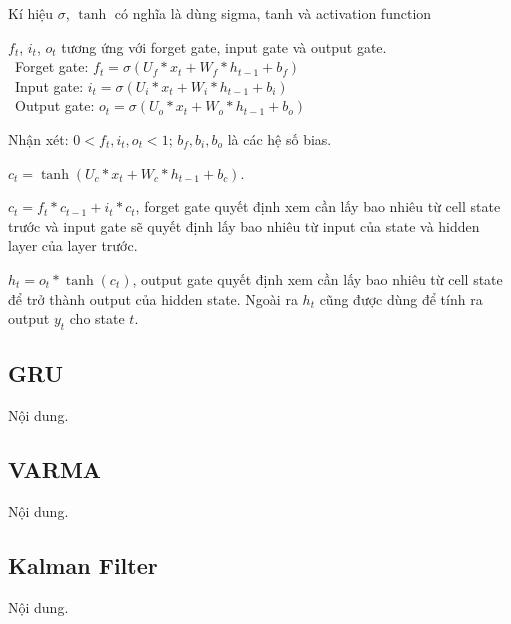 Kí hiệu \(\sigma\), \(\tanh\) có nghĩa là dùng sigma, tanh và activation function
\par
\( f_t \), \( i_t \), \( o_t \) tương ứng với forget gate, input gate và output gate.\\
    \indent\textbullet\ Forget gate: \( f_t = \sigma\left(U_f \ast x_t + W_f \ast h_{t-1} + b_f\right) \)\\
    \indent\textbullet\ Input gate: \( i_t = \sigma\left(U_i \ast x_t + W_i \ast h_{t-1} + b_i\right) \)\\
    \indent\textbullet\ Output gate: \( o_t = \sigma\left(U_o \ast x_t + W_o \ast h_{t-1} + b_o\right) \)
\par
Nhận xét: \( 0 < f_t, i_t, o_t < 1 \); \( b_f, b_i, b_o \) là các hệ số bias.
\par
\( c_t = \tanh\left(U_c \ast x_t + W_c \ast h_{t-1} + b_c\right) \).
\par
\( c_t = f_t \ast c_{t-1} + i_t \ast c_t \), forget gate quyết định xem cần lấy bao nhiêu từ cell state trước và input gate sẽ quyết định lấy bao nhiêu từ input của state và hidden layer của layer trước.
\par
\( h_t = o_t \ast \tanh\left(c_t\right) \), output gate quyết định xem cần lấy bao nhiêu từ cell state để trở thành output của hidden state. Ngoài ra \( h_t \) cũng được dùng để tính ra output \( y_t \) cho state \( t \).


\subsection{GRU}
Nội dung.

\subsection{VARMA}
Nội dung. 

\subsection{Kalman Filter}
Nội dung.

